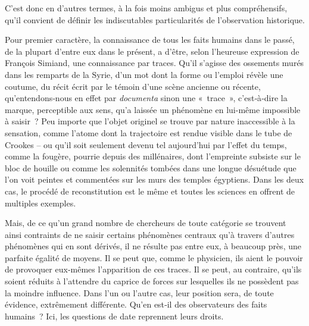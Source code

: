 \documentclass[french,twoside]{book} %
\newcommand{\astermono}{\medskip\centerline{\color{rubric}\large\selectfont{\syms ✻}}\medskip\par}%
\begin{document}
\noindent C’est donc en d’autres termes, à la fois moins ambigus et plus compré­hensifs, qu’il convient de définir les indiscutables particularités de l’obser­vation historique.\par
\label{p21} Pour premier caractère, la connaissance de tous les faits humains dans le passé, de la plupart d’entre eux dans le présent, a d’être, selon l’heureuse expression de François Simiand, une connaissance par traces. Qu’il s’agisse des ossements murés dans les remparts de la Syrie, d’un mot dont la forme ou l’emploi révèle une coutume, du récit écrit par le témoin d’une scène ancienne ou récente, qu’entendons‑nous en effet par \emph{documenta} sinon une « trace », c’est‑à‑dire la marque, perceptible aux sens, qu’a laissée un phénomène en lui-même impossible à saisir ? Peu importe que l’objet originel se trouve par nature inaccessible à la sensation, comme l’atome dont la trajectoire est rendue visible dans le tube de Crookes – ou qu’il soit seulement devenu tel aujourd’hui par l’effet du temps, comme la fougère, pourrie depuis des millénaires, dont l’empreinte subsiste sur le bloc de houille ou comme les solennités tombées dans une longue désuétude que l’on voit peintes et commentées sur les murs des temples égyp­tiens. Dans les deux cas, le procédé de reconstitution est le même et toutes les sciences en offrent de multiples exemples.\par
Mais, de ce qu’un grand nombre de chercheurs de toute catégorie se trouvent ainsi contraints de ne saisir certains phénomènes centraux qu’à travers d’autres phénomènes qui en sont dérivés, il ne résulte pas entre eux, à beaucoup près, une parfaite égalité de moyens. Il se peut que, comme le physicien, ils aient le pouvoir de provoquer eux‑mêmes l’apparition de ces traces. Il se peut, au contraire, qu’ils soient réduits à l’attendre du caprice de forces sur lesquelles ils ne possèdent pas la moindre influence. Dans l’un ou l’autre cas, leur position sera, de toute évidence, extrêmement différente. Qu’en est‑il des observateurs des faits humains ? Ici, les ques­tions de date reprennent leurs droits.\par

\astermono
\end{document}

